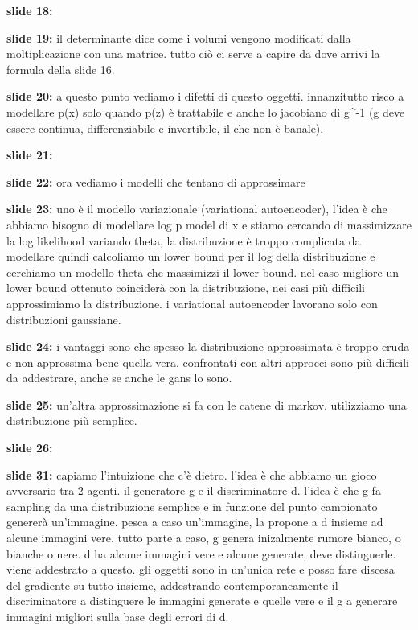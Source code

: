 \textbf{slide 18:} 

\textbf{slide 19:} il determinante dice come i volumi vengono modificati dalla moltiplicazione con una 
matrice. tutto ciò ci serve a capire da dove arrivi la formula della slide 16. 

\textbf{slide 20:} a questo punto vediamo i difetti di questo oggetti. innanzitutto risco a modellare p(x) solo
quando p(z) è trattabile e anche lo jacobiano di g^-1 (g deve essere continua, differenziabile e invertibile,
il che non è banale).

\textbf{slide 21:} 

\textbf{slide 22:} ora vediamo i modelli che tentano di approssimare

\textbf{slide 23:} uno è il modello variazionale (variational autoencoder), l'idea è che abbiamo bisogno di 
modellare log p model di x e stiamo cercando di massimizzare la log likelihood variando theta, la distribuzione
è troppo complicata da modellare quindi calcoliamo un lower bound per il log della distribuzione e cerchiamo
un modello theta che massimizzi il lower bound. nel caso migliore un lower bound ottenuto coinciderà con la 
distribuzione, nei casi più difficili approssimiamo la distribuzione. i variational autoencoder lavorano solo
con distribuzioni gaussiane.

\textbf{slide 24:} i vantaggi sono che spesso la distribuzione approssimata è troppo cruda e non approssima
bene quella vera. confrontati con altri approcci sono più difficili da addestrare, anche se anche le gans 
lo sono.

\textbf{slide 25:} un'altra approssimazione si fa con le catene di markov. utilizziamo una distribuzione più
semplice. 

\textbf{slide 26:} 

\textbf{slide 31:} capiamo l'intuizione che c'è dietro. l'idea è che abbiamo un gioco avversario tra 2 agenti.
il generatore g e il discriminatore d. l'idea è che g fa sampling da una distribuzione semplice e in funzione
del punto campionato genererà un'immagine. pesca a caso un'immagine, la propone a d insieme ad alcune immagini
vere. tutto parte a caso, g genera inizalmente rumore bianco, o bianche o nere. d ha alcune immagini vere e 
alcune generate, deve distinguerle. viene addestrato a questo. gli oggetti sono in un'unica rete e posso fare
discesa del gradiente su tutto insieme, addestrando contemporaneamente il discriminatore a distinguere 
le immagini generate e quelle vere e il g a generare immagini migliori sulla base degli errori di d. 

